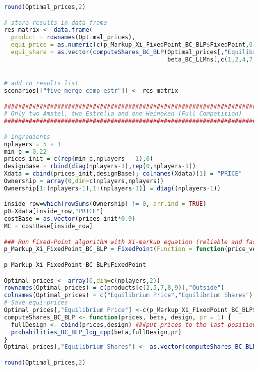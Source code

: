 \begin{lstlisting}[language=R,caption={Computing dynamic Nash equilibria in different competitive scenarios via the fixed point algorithm}, label=lst_nash_esti]
round(Optimal_prices,2)

# store results in data frame
res_matrix <- data.frame(
  product = rownames(Optimal_prices),
  equi_price = as.numeric(c(p_Markup_Xi_FixedPoint_BC_BLP$FixedPoint,0)),
  equi_share = as.vector(computeShares_BC_BLP(Optimal_prices[,"Equilibrium Price"],
                                              beta_BC_LLMns[,c(1,2,4,7,9,10,11)],designBase,pr=1)))


# add to results list
scenarios[["five_merge_comp_estr"]] <- res_matrix

###########################################################################
# Only two Amstel, two Estrella and one Heineken (Full Competition)
###########################################################################

# ingredients
nplayers = 5 + 1 
min_p = 0.22
prices_init = c(rep(min_p,nplayers - 1),0)
designBase = rbind(diag(nplayers-1),rep(0,nplayers-1))
Xdata = cbind(prices_init,designBase); colnames(Xdata)[1] = "PRICE" 
Ownership = array(0,dim=c(nplayers,nplayers))
Ownership[1:(nplayers-1),1:(nplayers-1)] = diag((nplayers-1))

inside_row=which(rowSums(Ownership) != 0, arr.ind = TRUE)
p0=Xdata[inside_row,"PRICE"]
costBase = as.vector(prices_init*0.9)
MC = costBase[inside_row]

### Run Fixed-Point algorithm with Xi-markup equation (reliable and fast: See Table 3 in paper for comparison)
p_Markup_Xi_FixedPoint_BC_BLP = FixedPoint(Function = function(price_vec) FixedPoint_BLP_Xi(price_vec,MC=MC, ownership=Ownership,Xdata=Xdata,beta_draws=beta_BC_LLMns[,(c(1,2,4,7,9,10,11))],pr=1),  Inputs = p0, MaxIter = 10000, ConvergenceMetricThreshold = 1e-10, Method = "Anderson")

p_Markup_Xi_FixedPoint_BC_BLP$FixedPoint

Optimal_prices <- array(0,dim=c(nplayers,2))
rownames(Optimal_prices) = c(products[c(2,5,7,8,9)],"Outside")
colnames(Optimal_prices) = c("Equilibrium Price","Equilibrium Shares")
# Save equi-prices
Optimal_prices[,"Equilibrium Price"] <-c(p_Markup_Xi_FixedPoint_BC_BLP$FixedPoint,0)
computeShares_BC_BLP <- function(prices, beta, design, pr = 1) {
  fullDesign <- cbind(prices,design) ###put prices to the last position here
  probabilities_BC_BLP_log_cpp(beta,fullDesign,pr)
}
Optimal_prices[,"Equilibrium Shares"] <- as.vector(computeShares_BC_BLP(Optimal_prices[,"Equilibrium Price"], beta_BC_LLMns[,c(1,2,4,7,9,10,11)],designBase,pr=1))

round(Optimal_prices,2)


\end{lstlisting}
